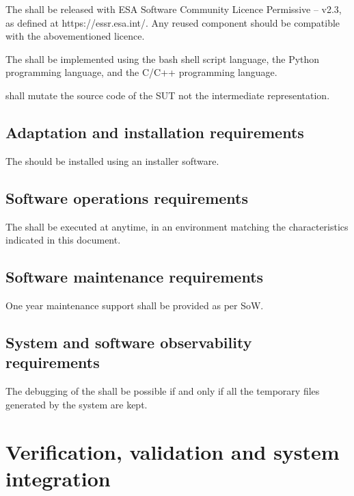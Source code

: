 \RQ{} The \FAQAS shall be released with ESA Software Community Licence Permissive – v2.3, as defined at https://essr.esa.int/. Any reused component should be compatible with the abovementioned licence.

\RQ{} The \FAQAS shall be implemented using the bash shell script language, the Python programming language, and the C/C++ programming language.

\RQ{} \FAQAS shall mutate the source code of the SUT not the intermediate representation.


\section{Adaptation and installation requirements}


%
\RQ{} The \FAQAS should be installed using an installer software.


\section{Software operations requirements}

\RQ{} The \FAQAS shall be executed at anytime,
in an environment matching the characteristics indicated in this document.

\section{Software maintenance requirements}

\RQ{} One year maintenance support shall be provided as per SoW.

\section{System and software observability requirements}

\RQ{} The debugging of the \FAQAS shall be possible if and only if
all the temporary files generated by the system are kept.

\chapter{Verification, validation and system integration}
